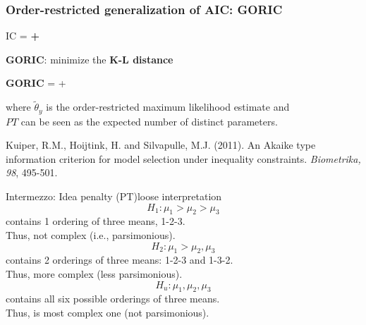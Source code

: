 \documentclass[10pt]{beamer}\usepackage[]{graphicx}\usepackage[]{xcolor}
\begin{document}
%
\begin{frame}
	\frametitle{Order-restricted generalization of AIC: GORIC}
	
	\centerline{	IC = \textbf{{\color{orange}{model misfit}} + {\color{purple}{model complexity}}}}
	\vspace{.5 cm}
	
	{\textbf{GORIC}: minimize the \textbf{K-L distance}}
	
	\vspace{1cm}
	\centerline{{\textbf{GORIC} ={} + \color{purple}{$2 PT$}}}
	
	\vspace{.5 cm}
	where $\tilde{\theta}_y$ is the order-restricted maximum likelihood estimate and\\
	$PT$ can be seen as the expected number of distinct parameters.
	
	\vspace{.5 cm}
	\footnotesize{
	Kuiper, R.M., Hoijtink, H. and Silvapulle, M.J. (2011). An Akaike type information criterion for model selection under inequality constraints. \emph{Biometrika, 98}, 495-501.
	}
	
\end{frame}
%
\begin{frame}{Intermezzo: Idea penalty (PT)}{loose interpretation}
\begin{displaymath}
H_1: \mu_1 > \mu_2 > \mu_3
\end{displaymath}
contains 1 ordering of three means, 1-2-3. \\
Thus, not complex (i.e., parsimonious).
\begin{displaymath}
H_2: \mu_1 > \mu_2, \mu_3
\end{displaymath}
contains 2 orderings of three means: 1-2-3 and 1-3-2. \\
Thus, more complex (less parsimonious).
\begin{displaymath}
H_u: \mu_1 , \mu_2 , \mu_3
\end{displaymath}
contains all six possible orderings of three means. \\
Thus, is most complex one (not parsimonious).
\end{frame}
%
\end{document}
